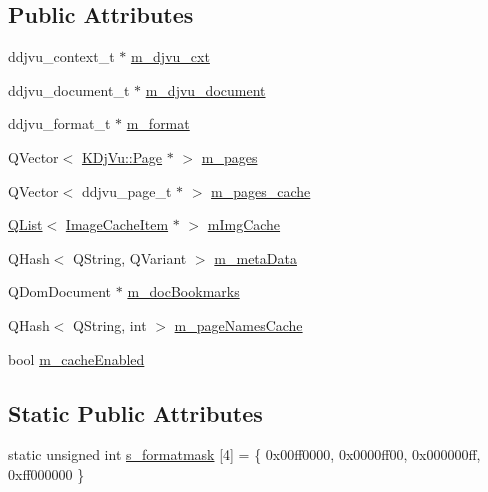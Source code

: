 \subsection*{Public Attributes}
\begin{DoxyCompactItemize}
\item 
ddjvu\+\_\+context\+\_\+t $\ast$ \hyperlink{classKDjVu_1_1Private_a5a52150a7ab9bbd584d6d73d68ae9ba1}{m\+\_\+djvu\+\_\+cxt}
\item 
ddjvu\+\_\+document\+\_\+t $\ast$ \hyperlink{classKDjVu_1_1Private_a183f9508738c71bb5abab150619a5ccd}{m\+\_\+djvu\+\_\+document}
\item 
ddjvu\+\_\+format\+\_\+t $\ast$ \hyperlink{classKDjVu_1_1Private_aad4bfbe2fe3646d6c9f862e6575c00cb}{m\+\_\+format}
\item 
Q\+Vector$<$ \hyperlink{classKDjVu_1_1Page}{K\+Dj\+Vu\+::\+Page} $\ast$ $>$ \hyperlink{classKDjVu_1_1Private_a0c009b87dde95717ec9e9a8f701e6628}{m\+\_\+pages}
\item 
Q\+Vector$<$ ddjvu\+\_\+page\+\_\+t $\ast$ $>$ \hyperlink{classKDjVu_1_1Private_a7c2361a6591fe13e69bc7982a3efd780}{m\+\_\+pages\+\_\+cache}
\item 
\hyperlink{classQList}{Q\+List}$<$ \hyperlink{classImageCacheItem}{Image\+Cache\+Item} $\ast$ $>$ \hyperlink{classKDjVu_1_1Private_a447ca81b4cc0237ac52aa8bfadd1258e}{m\+Img\+Cache}
\item 
Q\+Hash$<$ Q\+String, Q\+Variant $>$ \hyperlink{classKDjVu_1_1Private_a48e70e9e1d6e964cacaf5bc8295dcba7}{m\+\_\+meta\+Data}
\item 
Q\+Dom\+Document $\ast$ \hyperlink{classKDjVu_1_1Private_a44dd323816fabcc89971ce3d0b9b72a7}{m\+\_\+doc\+Bookmarks}
\item 
Q\+Hash$<$ Q\+String, int $>$ \hyperlink{classKDjVu_1_1Private_ad9d14bf5618d9bd6fc6c0595f7122bf5}{m\+\_\+page\+Names\+Cache}
\item 
bool \hyperlink{classKDjVu_1_1Private_a61eaa61e0d4e31a7e411a481df9827ee}{m\+\_\+cache\+Enabled}
\end{DoxyCompactItemize}
\subsection*{Static Public Attributes}
\begin{DoxyCompactItemize}
\item 
static unsigned int \hyperlink{classKDjVu_1_1Private_a4faf2c57e9e0b65a5adf0d55115c6ae1}{s\+\_\+formatmask} \mbox{[}4\mbox{]} = \{ 0x00ff0000, 0x0000ff00, 0x000000ff, 0xff000000 \}
\end{DoxyCompactItemize}


